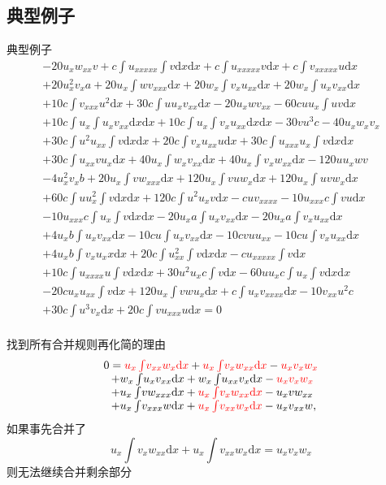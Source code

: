 \documentclass{beamer}
\newcommand{\dd}[1]{\mathrm{d}#1}
\newcommand{\ii}[1]{\int\!{#1\dd x}}
\newcommand{\red}[1]{{\color{red}#1}}
\begin{document}
\subsection{典型例子}
\begin{frame}{典型例子}
\[
\renewcommand{\arraystretch}{1.0}
\begin{array}{l}
-20u_xw_{xx}v
+c\ii{u_{xxxxx}\ii{v}}
+c\ii{u_{xxxxx}v}
+c\ii{v_{xxxxx}u}\\%
+20u_x^2v_xa
+20u_x\ii{wv_{xxx}}
+20w_x\ii{v_xu_{xx}}
+20w_x\ii{u_xv_{xx}}\\%
+10c\ii{v_{xxx}u^2}
+30c\ii{uu_xv_{xx}}
-20u_xwv_{xx}
-60cuu_x\ii{uv}\\%
+10c\ii{u_x\ii{u_xv_{xx}}}
+10c\ii{u_x\ii{v_xu_{xx}}}
-30vu^3c
-40u_xw_xv_x\\%
+30c\ii{u^2u_{xx}\ii{v}}
+20c\ii{v_xu_{xx}u}
+30c\ii{u_{xxx}u_x\ii{v}}\\%
+30c\ii{u_{xx}vu_x}
+40u_x\ii{w_xv_{xx}}
+40u_x\ii{v_xw_{xx}}
-120uu_xwv\\%
-4u_x^2v_xb
+20u_x\ii{vw_{xxx}}
+120u_x\ii{vuw_x}
+120u_x\ii{uvw_x}\\%
+60c\ii{uu_x^2\ii{v}}
+120c\ii{u^2u_xv}
-cuv_{xxxx}
-10u_{xxx}c\ii{vu}\\%
-10u_{xxx}c\ii{u_x\ii{v}}
-20u_xa\ii{u_xv_{xx}}
-20u_xa\ii{v_xu_{xx}}\\%
+4u_xb\ii{u_xv_{xx}}
-10cu\ii{u_xv_{xx}}
-10c v u u_{xx}
-10cu\ii{v_xu_{xx}}\\%
+4u_xb\ii{v_xu_xx}
+20c\ii{u_{xx}^2\ii{v}}
-cu_{xxxxx}\ii{v}\\%
+10c\ii{u_{xxxx}u\ii{v}}
+30u^2u_xc\ii{v}
-60uu_xc\ii{u_x\ii{v}}\\%
-20cu_xu_{xx}\ii{v}
+120u_x\ii{vwu_x}
+c\ii{u_xv_{xxxx}}
-10v_{xx}u^2c\\%
+30c\ii{u^3v_x}
+20c\ii{vu_{xxx}u}=0\\%
\end{array}
\]
\end{frame}

\begin{frame}{找到所有合并规则再化简的理由}
\[
\begin{array}{l}
0=\red{u_x\int\!{v_{xx}w_x\dd x}}+\red{u_x\int\!{v_xw_{xx}\dd x}}-\red{u_xv_xw_x}\\
~~+w_x\int\!{u_xv_{xx}\dd x}+w_x\int\!{u_{xx}v_x\dd x}-\red{u_xv_xw_x}\\
~~+u_x\int\!{vw_{xxx}\dd x}+\red{u_x\int\!{v_xw_{xx}\dd x}}-u_xvw_{xx}\\
~~+u_x\int\!{v_{xxx}w\dd x}+\red{u_x\int\!{v_{xx}w_x\dd x}}-u_xv_{xx}w ,
\end{array}
\]
如果事先合并了
\[
    u_x\int\!{v_xw_{xx}\dd x}+u_x\int\!{v_{xx}w_x\dd x}=u_xv_xw_x
\]
则无法继续合并剩余部分
\end{frame}
\end{document}
